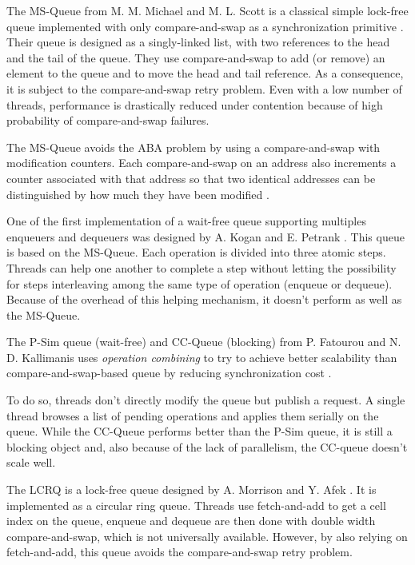  The MS-Queue from M. M. Michael and M. L. Scott is a classical
simple lock-free queue implemented with only compare-and-swap as a
synchronization primitive \cite{Michael96simple}. Their queue is designed as a
singly-linked list, with two references to the head and the tail of the queue.
They use compare-and-swap to add (or remove) an element to the queue and to move
the head and tail reference. As a consequence, it is subject to the
compare-and-swap retry problem. Even with a low number of threads, performance
is drastically reduced under contention because of high probability of
compare-and-swap failures.

The MS-Queue avoids the ABA problem by using a compare-and-swap with
modification counters. Each compare-and-swap on an address also increments a
counter associated with that address so that two identical addresses can be
distinguished by how much they have been modified \cite{Herlihy08}
\cite{Michael96simple}. \medskip

 One of the first implementation of a wait-free
queue supporting multiples enqueuers and dequeuers was designed by A. Kogan and
E. Petrank \cite{Kogan:2011:WQM:2038037.1941585}. This queue is based on the
MS-Queue. Each operation is divided into three atomic steps. Threads can help
one another to complete a step without letting the possibility for steps
interleaving among the same type of operation (enqueue or dequeue). Because of
the overhead of this helping mechanism, it doesn't perform as well as the
MS-Queue. \medskip

 The P-Sim queue (wait-free) and CC-Queue (blocking)
from P. Fatourou and N. D. Kallimanis uses \textit{operation combining} to try
to achieve better scalability than compare-and-swap-based queue by reducing
synchronization cost \cite{Fatourou:2011:HWU:1989493.1989549}
\cite{Fatourou:2012:RCS:2370036.2145849}.

To do so, threads don't directly modify the queue but publish a request. A
single thread browses a list of pending operations and applies them serially on
the queue. While the CC-Queue performs better than the P-Sim queue, it is still
a blocking object and, also because of the lack of parallelism, the CC-queue
doesn't scale well. \medskip

 The LCRQ is a lock-free queue designed by A. Morrison
and Y. Afek \cite{Morrison:2013:FCQ:2517327.2442527}. It is implemented as a
circular ring queue. Threads use fetch-and-add to get a cell index on the queue,
enqueue and dequeue are then done with double width compare-and-swap, which is
not universally available. However, by also relying on fetch-and-add, this queue
avoids the compare-and-swap retry problem. \medskip

